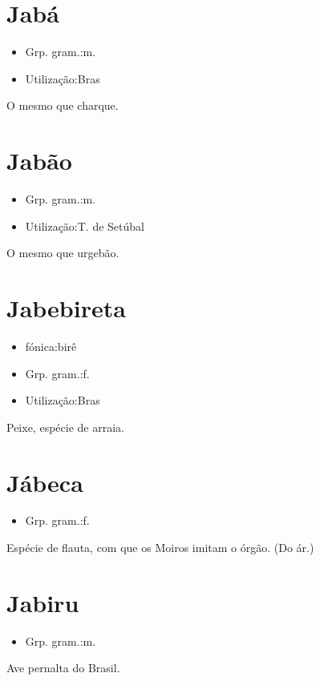 \documentclass{article}
\begin{document}
\section{Jabá}
\begin{itemize}
\item {Grp. gram.:m.}
\end{itemize}
\begin{itemize}
\item {Utilização:Bras}
\end{itemize}
O mesmo que \textunderscore charque\textunderscore .
\section{Jabão}
\begin{itemize}
\item {Grp. gram.:m.}
\end{itemize}
\begin{itemize}
\item {Utilização:T. de Setúbal}
\end{itemize}
O mesmo que \textunderscore urgebão\textunderscore .
\section{Jabebireta}
\begin{itemize}
\item {fónica:birê}
\end{itemize}
\begin{itemize}
\item {Grp. gram.:f.}
\end{itemize}
\begin{itemize}
\item {Utilização:Bras}
\end{itemize}
Peixe, espécie de arraia.
\section{Jábeca}
\begin{itemize}
\item {Grp. gram.:f.}
\end{itemize}
Espécie de flauta, com que os Moiros imitam o órgão.
(Do ár.)
\section{Jabiru}
\begin{itemize}
\item {Grp. gram.:m.}
\end{itemize}
Ave pernalta do Brasil.
\end{document}
